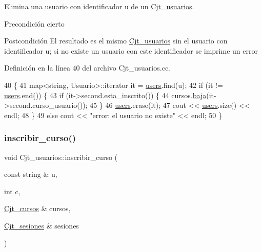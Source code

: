 Elimina una usuario con identificador u de un \mbox{\hyperlink{class_cjt__usuarios}{Cjt\+\_\+usuarios}}. 

\begin{DoxyPrecond}{Precondición}
cierto 
\end{DoxyPrecond}
\begin{DoxyPostcond}{Postcondición}
El resultado es el mismo \mbox{\hyperlink{class_cjt__usuarios}{Cjt\+\_\+usuarios}} sin el usuario con identificador u; si no existe un usuario con este identificador se imprime un error 
\end{DoxyPostcond}


Definición en la línea 40 del archivo Cjt\+\_\+usuarios.\+cc.


\begin{DoxyCode}
40                                                                          \{
41         map<string, Usuario>::iterator it = \mbox{\hyperlink{class_cjt__usuarios_a0b702ca0184d6fb2674cc827d39d5bff}{users}}.find(u);
42         \textcolor{keywordflow}{if} (it != \mbox{\hyperlink{class_cjt__usuarios_a0b702ca0184d6fb2674cc827d39d5bff}{users}}.end()) \{
43           \textcolor{keywordflow}{if} (it->second.esta\_inscrito()) \{
44             cursos.\mbox{\hyperlink{class_cjt__cursos_a01b47ced7b3b96ea87775bb4e2f0302a}{baja}}(it->second.curso\_usuario());
45           \}
46           \mbox{\hyperlink{class_cjt__usuarios_a0b702ca0184d6fb2674cc827d39d5bff}{users}}.erase(it);
47           cout << \mbox{\hyperlink{class_cjt__usuarios_a0b702ca0184d6fb2674cc827d39d5bff}{users}}.size() << endl;
48         \}
49         \textcolor{keywordflow}{else} cout << \textcolor{stringliteral}{"error: el usuario no existe"} << endl;
50       \}
\end{DoxyCode}
\mbox{\label{class_cjt__usuarios_a94946c0533b04337bee7395f1dac0366}} 
\subsubsection{\texorpdfstring{inscribir\+\_\+curso()}{inscribir\_curso()}}
{\footnotesize\ttfamily void Cjt\+\_\+usuarios\+::inscribir\+\_\+curso (\begin{DoxyParamCaption}\item[{const string \&}]{u,  }\item[{int}]{c,  }\item[{\mbox{\hyperlink{class_cjt__cursos}{Cjt\+\_\+cursos}} \&}]{cursos,  }\item[{\mbox{\hyperlink{class_cjt__sesiones}{Cjt\+\_\+sesiones}} \&}]{sesiones }\end{DoxyParamCaption})}



